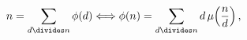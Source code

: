 \[n=\sum_{d\divides n}\mathop{\phi\/}\nolimits\!\left(d\right)%
\Longleftrightarrow\mathop{\phi\/}\nolimits\!\left(n\right)=\sum_{d\divides n}%
d\mathop{\mu\/}\nolimits\!\left(\frac{n}{d}\right),\]